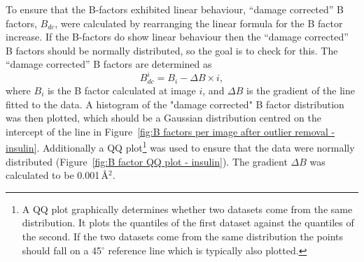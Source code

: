 To ensure that the B-factors exhibited linear behaviour, ``damage corrected'' B factors, $B_{dc}$, were calculated by rearranging the linear formula for the B factor increase.
If the B-factors do show linear behaviour then the ``damage corrected'' B factors should be normally distributed, so the goal is to check for this.
The ``damage corrected'' B factors are determined as
\begin{equation}
    B^i_{dc} = B_i - \Delta B \times i,
\end{equation}
where $B_i$ is the B factor calculated at image $i$, and $\Delta B$ is the gradient of the line fitted to the data.
A histogram of the "damage corrected" B factor distribution was then plotted, which should be a Gaussian distribution centred on the intercept of the line in Figure~\ref{fig:B factors per image after outlier removal - insulin}.
Additionally a QQ plot\footnote{A QQ plot graphically determines whether two datasets come from the same distribution. It plots the quantiles of the first dataset against the quantiles of the second. If the two datasets come from the same distribution the points should fall on a 45$^{\circ}$ reference line which is typically also plotted.} was used to ensure that the data were normally distributed (Figure~\ref{fig:B factor QQ plot - insulin}).
The gradient $\Delta B$ was calculated to be 0.001$\,$\AA$^2$.
